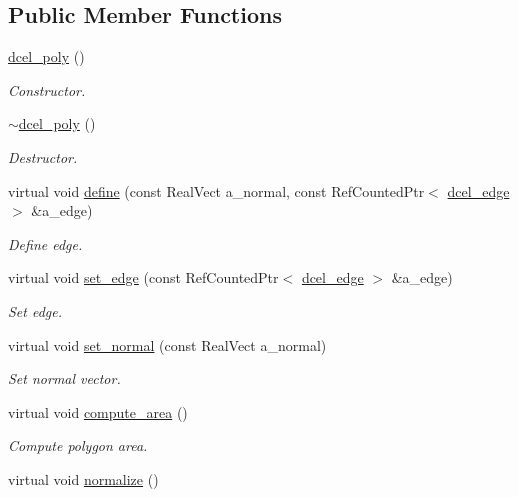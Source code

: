 \subsection*{Public Member Functions}
\begin{DoxyCompactItemize}
\item 
\hyperlink{classdcel__poly_a920aab2af3168cc15894d4e979bfad30}{dcel\+\_\+poly} ()
\begin{DoxyCompactList}\small\item\em Constructor. \end{DoxyCompactList}\item 
\hyperlink{classdcel__poly_a879eef335197883ebd496d2ec61b8163}{$\sim$dcel\+\_\+poly} ()
\begin{DoxyCompactList}\small\item\em Destructor. \end{DoxyCompactList}\item 
virtual void \hyperlink{classdcel__poly_a6435ac13d4ed3727bcd7144e3798d0d3}{define} (const Real\+Vect a\+\_\+normal, const Ref\+Counted\+Ptr$<$ \hyperlink{classdcel__edge}{dcel\+\_\+edge} $>$ \&a\+\_\+edge)
\begin{DoxyCompactList}\small\item\em Define edge. \end{DoxyCompactList}\item 
virtual void \hyperlink{classdcel__poly_ac90f809c7c8336f73ef2e34c5c55f90d}{set\+\_\+edge} (const Ref\+Counted\+Ptr$<$ \hyperlink{classdcel__edge}{dcel\+\_\+edge} $>$ \&a\+\_\+edge)
\begin{DoxyCompactList}\small\item\em Set edge. \end{DoxyCompactList}\item 
virtual void \hyperlink{classdcel__poly_a9d65d1c2a34d9acc4af0f313885a5787}{set\+\_\+normal} (const Real\+Vect a\+\_\+normal)
\begin{DoxyCompactList}\small\item\em Set normal vector. \end{DoxyCompactList}\item 
virtual void \hyperlink{classdcel__poly_a022eb4f41cfe67df0a6a3ea4de338562}{compute\+\_\+area} ()
\begin{DoxyCompactList}\small\item\em Compute polygon area. \end{DoxyCompactList}\item 
virtual void \hyperlink{classdcel__poly_a65ccd781dd4ec9c946a1d52ffcf826a3}{normalize} ()

\end{DoxyCompactItemize}
